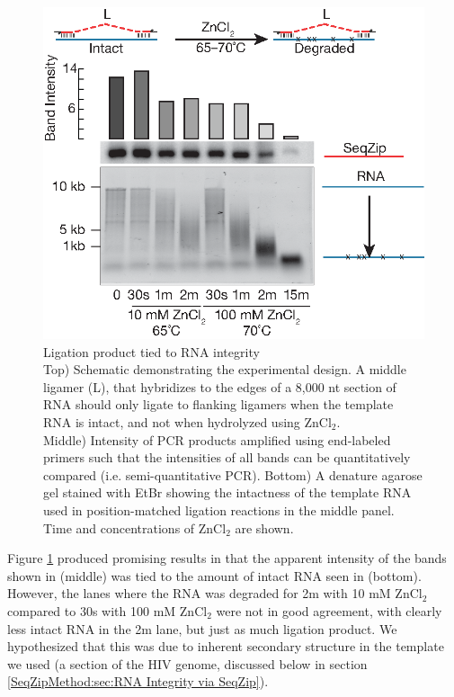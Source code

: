 	  \begin{figure} %
    	\centering 
    	\includegraphics{Figures/SeqZipMethod/DegreadedRNABySeqZip.eps}
    	\caption[Ligation product tied to RNA integrity]
    	{
		    Ligation product tied to RNA integrity\\[0.25cm]
      	Top) Schematic demonstrating the experimental design. A middle ligamer (L), that hybridizes to the edges of a 8,000 nt section of RNA should only ligate to flanking ligamers when the template RNA is intact, and not when hydrolyzed using ZnCl$_{2}$. \\
        Middle) Intensity of PCR products amplified using end-labeled primers such that the intensities of all bands can be quantitatively compared (i.e. semi-quantitative PCR). Bottom) A denature agarose gel stained with EtBr showing the intactness of the template RNA used in position-matched ligation reactions in the middle panel. Time and concentrations of ZnCl$_{2}$ are shown.
    		}
    	\label{SeqZipMethod:fig:Ligation product and RNA integrity}
  		\end{figure}

    Figure \ref{SeqZipMethod:fig:Ligation product and RNA integrity} produced promising results in that the apparent intensity of the bands shown in (middle) was tied to the amount of intact RNA seen in (bottom). However, the lanes where the RNA was degraded for 2m with 10 mM ZnCl$_{2}$ compared to 30s with 100 mM ZnCl$_{2}$ were not in good agreement, with clearly less intact RNA in the 2m lane, but just as much ligation product. We hypothesized that this was due to inherent secondary structure in the template we used (a section of the HIV genome, discussed below in section \ref{SeqZipMethod:sec:RNA Integrity via SeqZip}). 

